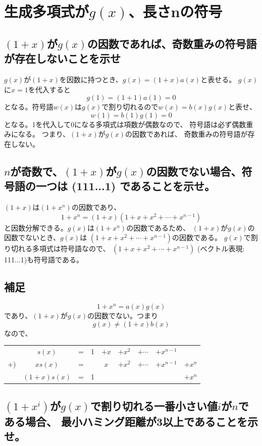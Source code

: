 \documentclass[a4paper,11pt]{jsarticle}
\begin{document}
\section{生成多項式が$g(x)$、長さnの符号}
\subsection{$(1+x)$が$g(x)$の因数であれば、奇数重みの符号語が存在しないことを示せ}
$g(x)$が$(1+x)$を因数に持つとき、$g(x)=(1+x)a(x)$と表せる。
$g(x)$に$x=1$を代入すると
\[
  g(1)=(1+1)a(1)=0
\]
となる。符号語$w(x)$は$g(x)$で割り切れるので$w(x)=b(x)g(x)$と表せ、
\[
  w(1)=b(1)g(1)=0
\]
となる。1を代入して0になる多項式は項数が偶数なので、
符号語は必ず偶数重みになる。
つまり、$(1+x)$が$g(x)$の因数であれば、
奇数重みの符号語が存在しない。

\subsection{$n$が奇数で、$(1+x)$が$g(x)$の因数でない場合、符号語の一つは (111...1) であることを示せ。}
$(1+x)$は$(1+x^n)$の因数であり、
\[
  1+x^n=(1+x)(1+x+x^2+ \cdots +x^{n-1})
\]
と因数分解できる。$g(x)$は$(1+x^n)$の因数であるため、
$(1+x)$が$g(x)$の因数でないとき、$g(x)$は
$(1+x+x^2+ \cdots + x^{n-1})$の因数である。
$g(x)$で割り切れる多項式は符号語なので、
$(1+x+x^2+ \cdots + x^{n-1})$ (ベクトル表現: 111...1)も符号語である。

\subsection*{補足}
\begin{equation}
  \label{eq1}
  1+x^n=a(x)g(x)
\end{equation}
であり、$(1+x)$が$g(x)$の因数でない。つまり
\begin{equation}
  \label{eq2}
  g(x) \neq (1+x)b(x)
\end{equation}
なので、

\begin{table}[hbtp]
  \label{table:hissan}
  \centering
  \begin{tabular}{ccccccccc}
    & $s(x)$ & = & 1 & $+x$ & $+x^2$ & $+\cdots$ & $+x^{n-1}$ & \\
    +) & $xs(x)$ & = & & $x$ & $+x^2$ & $+\cdots$ & $+x^{n-1}$ & $+x^{n}$ \\ \hline
    & $(1+x)s(x)$ & = & 1 & & & & & $+x^n$
  \end{tabular}
\end{table}

\subsection{$(1+x^i)$が$g(x)$で割り切れる一番小さい値$i$が$n$である場合、 最小ハミング距離が3以上であることを示せ。}
\end{document}
